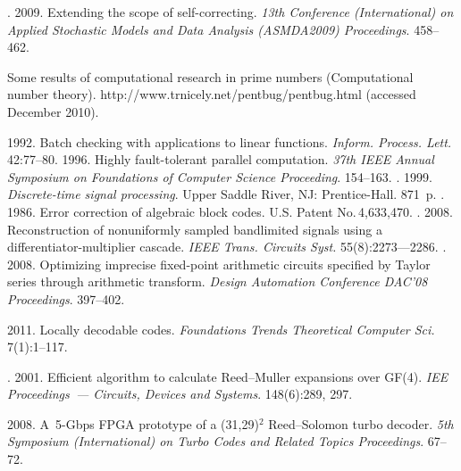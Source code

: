 \begin{multicols}{2}
{{\begin{thebibliography}{99}
. 2009. Extending the scope of self-correcting. 
\textit{13th Conference (International) on Applied 
Stochastic Models and Data Analysis (ASMDA2009)  Proceedings}. 458--462. 

 {Some results of computational research in prime numbers (Computational number theory)}.
{\sf  http://www.trnicely.net/pentbug/pentbug.html} (accessed December 2010).

 1992. Batch checking with applications to linear functions. 
\textit{Inform. Process. Lett.} 42:77--80.
 1996. Highly fault-tolerant parallel computation. \textit{37th IEEE  Annual Symposium on Foundations of 
Computer Science Proceeding}.  154--163.
. 1999.  
\textit{Discrete-time signal processing}. Upper Saddle River, 
NJ: Prentice-Hall. 871~p.
. 1986.  Error correction  of algebraic block codes. U.S. Patent No.\,4,633,470. 
. 2008. Reconstruction of nonuniformly sampled bandlimited  signals using a 
differentiator-multiplier cascade. \textit{IEEE Trans. Circuits  Syst.} 55(8):2273---2286.
. 2008. Optimizing imprecise fixed-point arithmetic circuits specified by Taylor series through 
arithmetic transform. \textit{Design Automation Conference  DAC'08 Proceedings}. 397--402.

 2011. Locally decodable codes. \textit{Foundations Trends Theoretical Computer Sci.} 7(1):1--117.

. 2001. Efficient algorithm to calculate Reed--Muller
expansions over GF(4). \textit{IEE Proceedings~--- Circuits, Devices and  
Systems}. 148(6):289, 297.

2008. A~5-Gbps FPGA prototype of a (31,29)$^2$ Reed--Solomon turbo decoder.
\textit{5th Symposium (International) on Turbo Codes and Related Topics Proceedings}.
67--72.



\end{thebibliography} } }

\end{multicols}

